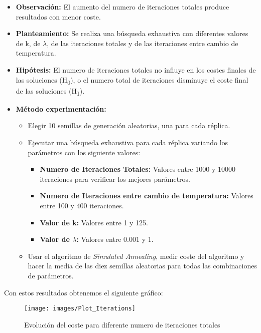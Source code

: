 \documentclass{article}
\begin{document}
\begin{enumerate}
  \begin{itemize}
    \item \textbf{Observación:} El aumento del numero de iteraciones totales produce resultados con menor coste.
    \item \textbf{Planteamiento:} Se realiza una búsqueda exhaustiva con diferentes valores de k, de ${\lambda}$, de las iteraciones totales y de las iteraciones entre cambio de temperatura.
    \item \textbf{Hipótesis:} El numero de iteraciones totales no influye en los costes finales de las soluciones (H\textsubscript{0}), o el numero total de iteraciones disminuye el coste final de las soluciones (H\textsubscript{1}).
    \item \textbf{Método experimentación:} \begin{itemize}
        \item Elegir 10 semillas de generación aleatorias, una para cada réplica.
        \item Ejecutar una búsqueda exhaustiva para cada réplica variando los parámetros con los siguiente valores:
        \begin{itemize}
            \item \textbf{Numero de Iteraciones Totales:} Valores entre 1000 y 10000 iteraciones para verificar los mejores parámetros.
            \item \textbf{Numero de Iteraciones entre cambio de temperatura:} Valores entre 100 y 400 iteraciones.
            \item \textbf{Valor de k:} Valores entre 1 y 125.
            \item \textbf{Valor de ${\lambda}$:} Valores entre 0.001 y 1.
        \end{itemize}
        \item Usar el algoritmo de \textit{Simulated Annealing}, medir coste del algoritmo y hacer la media de las diez semillas aleatorias para todas las combinaciones de parámetros.
    \end{itemize}
  \end{itemize}

 Con estos resultados obtenemos el siguiente gráfico:

  \begin{figure}[htp]
    \centering
    \texttt{[image: images/Plot\_Iterations]}\hfill
    \caption{Evolución del coste para diferente numero de iteraciones totales}
    \label{fig:SAPAR}
  \end{figure}


\end{enumerate}
\end{document}
